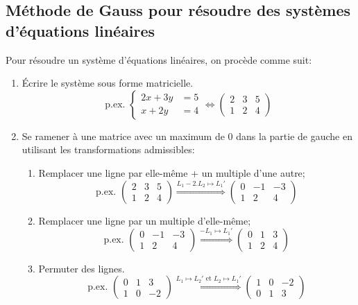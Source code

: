 \subsection{Méthode de Gauss pour résoudre des systèmes d'équations linéaires}

Pour résoudre un système d'équations linéaires, on procède comme suit:
\begin{enumerate}
	\item Écrire le système sous forme matricielle. \[\text{p.ex. } \begin{cases} 2x+3y &= 5 \\ x+2y &= 4 \end{cases} \Leftrightarrow \left(\begin{array}{cc|c} 2 & 3 & 5 \\ 1 & 2 & 4 \end{array}\right) \]
	\item Se ramener à une matrice avec un maximum de \( 0\) dans la partie de gauche en utilisant les transformations admissibles:
	      \begin{enumerate}
		      \item Remplacer une ligne par elle-même + un multiple d'une autre;
		            \[\text{p.ex. } \left(\begin{array}{cc|c} 2 & 3 & 5 \\ 1 & 2 & 4 \end{array}\right)  \stackrel{L_1  - 2. L_2 \mapsto L_1'}{\Longrightarrow} \left(\begin{array}{cc|c} 0 & -1 & -3 \\ 1 & 2 & 4 \end{array}\right) \]
		      \item Remplacer une ligne par un multiple d'elle-même;
		            \[\text{p.ex. } \left(\begin{array}{cc|c} 0 & -1 & -3 \\ 1 & 2 & 4 \end{array}\right)  \stackrel{-L_1  \mapsto L_1'}{\Longrightarrow} \left(\begin{array}{cc|c} 0 & 1 & 3 \\ 1 & 2 & 4 \end{array}\right) \]
		      \item Permuter des lignes.
		            \[\text{p.ex. } \left(\begin{array}{cc|c} 0 & 1 & 3 \\ 1 & 0 & -2 \end{array}\right)  \stackrel{L_1  \mapsto L_2' \text{ et } L_2  \mapsto L_1'}{\Longrightarrow} \left(\begin{array}{cc|c} 1 & 0 & -2 \\ 0 & 1 & 3  \end{array}\right) \]

\end{enumerate}
\end{enumerate}

